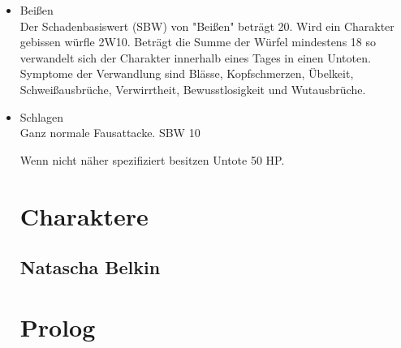 \begin{itemize}
\begin{itemize}
  \item Beißen
  \\Der Schadenbasiswert (SBW) von "Beißen" beträgt 20. Wird ein Charakter gebissen würfle 2W10. Beträgt die Summe der Würfel mindestens 18 so verwandelt sich der Charakter innerhalb eines Tages in einen Untoten.
  \\Symptome der Verwandlung sind Blässe, Kopfschmerzen, Übelkeit, Schweißausbrüche, Verwirrtheit, Bewusstlosigkeit und Wutausbrüche.
  \item Schlagen
  \\Ganz normale Fausattacke. SBW 10

  Wenn nicht näher spezifiziert besitzen Untote 50 HP.

\section{Charaktere}

\subsection{Natascha Belkin}


\section{Prolog}


\end{itemize}
\end{itemize}
